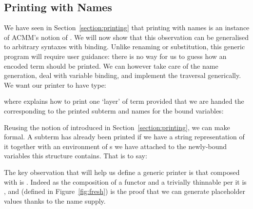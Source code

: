 
\subsection{Printing with Names}\label{section:genericprinting}

We have seen in Section~\ref{section:printing} that printing with names
is an instance of ACMM's notion of \semrec{}. We will now show that this
observation can be generalised to arbitrary syntaxes with binding. Unlike
renaming or substitution, this generic program will require user guidance:
there is no way for us to guess how an encoded term should be printed. We
can however take care of the name generation, deal with variable binding,
and implement the traversal generically. We want our printer to have type:

\begin{agdasnippet}
\end{agdasnippet}

\noindent
where  explains how to print one `layer' of term provided that
we are handed the  corresponding to the printed subterm and
names for the bound variables:

\begin{agdasnippet}
\end{agdasnippet}

Reusing the notion of  introduced in Section~\ref{section:printing},
we can make  formal. A subterm has already been printed if we
have a string representation of it together with an environment of s
we have attached to the newly-bound variables this structure contains.
That is to say:

\begin{agdasnippet}
\end{agdasnippet}

The key observation that will help us define a generic printer is that
 composed with  is . Indeed as the composition
of a functor and a trivially thinnable per it is ,
and  (defined in Figure~\ref{fig:fresh}) is the proof that we
can generate placeholder values thanks to the name supply.

\begin{agdasnippet}
\end{agdasnippet}

